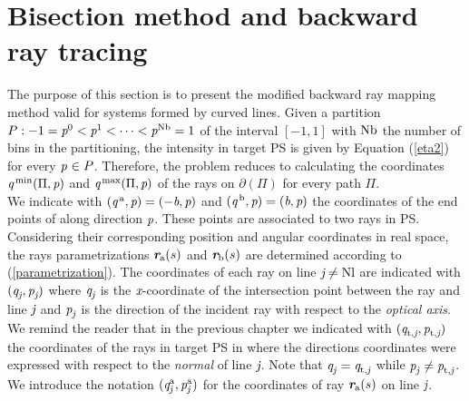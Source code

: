 \section{Bisection method and backward ray tracing}\label{sec:raymapping_explanation}
The purpose of this section is to present the modified backward ray mapping method valid for systems formed by curved lines. 
Given a partition $P: -1 = \textit{p}^0<\textit{p}^1<\cdots<\textit{p}^{\textrm{Nb}}=1$ of the interval $[-1,1]$ with $\textrm{Nb}$ the number of bins in the partitioning, the intensity in target PS is given by Equation (\ref{eta2}) for every $\textit{p}_{\textrm{} \textit{}}\in P$.
Therefore, the problem reduces to calculating the coordinates 
$\textit{q}^{\textrm{\,min}}(\Pi, \textit{p})$ and $\textit{q}^{\textrm{\,max}}(\Pi, \textit{p})$ of the rays on $\partial$$(\Pi)$ for every path $\Pi$. 
\\ \indent 
We indicate with $(\textit{q}^{\,\textrm{a}}, \textit{p})= (-\textit{b}, \textit{p})$ and $(\textit{q}^{\,\textrm{b}}, \textit{p}) = (\textit{b}, \textit{p})$ the coordinates of the end points of  along direction $\textit{p}$. These points are associated to two rays in PS. Considering their corresponding position and angular coordinates in real space, the rays parametrizations $\textit{\textbf{r}}_{\textrm{a}}(s)$ and $\textit{\textbf{r}}_{\textrm{b}}(s)$ are determined according to (\ref{parametrization}).
The coordinates of each ray on line $\textit{j}\neq \textrm{Nl}$ are indicated with $(\textit{q}_{\textit{j}}, \textit{p}_{\textit{j}})$ where $\textit{q}_{\textit{j}}$ is the $\textit{x}$-coordinate of the intersection point between the ray and line $\textit{j}$ and $\textit{p}_{\textit{j}}$ is the direction of the incident ray with respect to the \textit{optical axis}. 
We remind the reader that in the previous chapter we indicated with $(\textit{q}_{\textrm{t,} \textit{\textit{j}}},\textit{p}_{\textrm{t,} \textit{\textit{j}}})$ the coordinates of the rays in target PS  in where the directions coordinates were expressed with respect to the \textit{normal} of line $\textit{j}$. Note that $\textit{q}_{\textrm{\textit{j}} \textit{}}=\textit{q}_{\textrm{t,} \textit{\textit{j}}}$ while $\textit{p}_{\textrm{\textit{j}} \textit{}}\neq\textit{p}_{\textrm{t,} \textit{\textit{j}}}$. We introduce the notation $(\textit{q}_{\textrm{\textit{j}} \textit{}}^{\textrm{a}}, \textit{p}_{\textrm{\textit{j}} \textit{}}^{\textrm{a}})$ for the coordinates of ray $\textit{\textbf{r}}_{\textrm{a}}(s)$ on line $\textit{j}$.\\ \indent 
